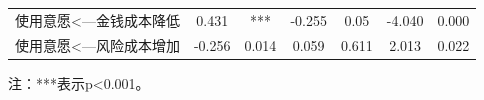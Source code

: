 \documentclass[12pt,UTF8]{ctexart}
\begin{document}
\begin{spacing}{1.25}
\begin{table}[H]
\begin{threeparttable}
\begin{tabular}{@{}ccccccc@{}}
使用意愿\textless{}---金钱成本降低 & 0.431                                      & ***                                       & -0.255                                      & 0.05                                       & -4.040                                             & 0.000                                             \\
使用意愿\textless{}---风险成本增加 & -0.256                                     & 0.014                                     & 0.059                                       & 0.611                                      & 2.013                                              & 0.022                                             \\ \bottomrule
\end{tabular}
\begin{tablenotes}
    \item 注：***表示p<0.001。
\end{tablenotes}
\end{threeparttable}
\end{table}



\end{spacing}
\end{document}
